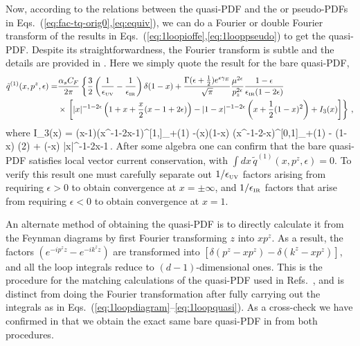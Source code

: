 \begin{widetext}
Now, according to the relations between the quasi-PDF and the \spcorr or pseudo-PDFs in Eqs.~(\ref{eq:fac-tq-orig0},\ref{eq:equiv}), we can do a Fourier or double Fourier transform of the results in Eqs.~(\ref{eq:1loopioffe},\ref{eq:1looppseudo}) to get the quasi-PDF. Despite its straightforwardness, the Fourier transform is subtle and the details are provided in . Here we simply quote the result for the bare quasi-PDF,
\begin{align}  \label{eq:1loopquasi}
\tilde{q}^{(1)}(x,p^z,\epsilon)
	=& {\alpha_sC_F\over 2\pi}\left\{{3\over2}\left({1\over \epsilon_{\mbox{\tiny UV}}}-{1\over \epsilon_{\mbox{\tiny IR}}}\right)\delta(1-x) + {\Gamma(\epsilon+{1\over2})e^{\epsilon\gamma_E}\over \sqrt{\pi}}{\mu^{2\epsilon}\over p_z^{2\epsilon}}{1-\epsilon \over \epsilon_{\mbox{\tiny IR}} (1-2\epsilon)} \right.\\
	&\times\left.\left[|x|^{-1-2\epsilon}\left(1+x+{x\over2}(x-1+2\epsilon)\right)-  |1-x|^{-1-2\epsilon}\left(x+{1\over2}(1-x)^2\right) + I_3(x)\right] \right\}\,,\nonumber
\end{align}
where
\beq
	I_3(x) = \theta(x-1)\left(x^{-1-2\epsilon}\over x-1\right)^{[1,\infty]}_{+(1)} -\theta(x)\theta(1-x) \left(x^{-1-2\epsilon}-x\right)^{[0,1]}_{+(1)} - \delta(1-x) \pi\csc(2\pi\epsilon) + \theta(-x) {|x|^{-1-2\epsilon}\over x-1}\,.
\eeq
After some algebra one can confirm that the bare quasi-PDF satisfies local vector current conservation, with $\int\! dx\, \tilde{q}^{(1)}(x,p^z,\epsilon) = 0$. To verify this result one must carefully separate out $1/\epsilon_{\mbox{\tiny UV}}$ factors arising from requiring $\epsilon>0$ to obtain convergence at $x=\pm \infty$, and $1/\epsilon_{\mbox{\tiny IR}}$ factors that arise from requiring $\epsilon<0$ to obtain convergence at $x=1$.

An alternate method of obtaining the quasi-PDF is to directly calculate it from the Feynman diagrams by first Fourier transforming $z$ into $xp^z$. As a result, the factors $(e^{-ip^z z}- e^{-ik^z z})$ are transformed into $[\delta(p^z-xp^z)-\delta(k^z-xp^z)]$, and all the loop integrals reduce to $(d-1)$-dimensional ones. This is the procedure for the matching calculations of the quasi-PDF used in Refs.~\cite{Xiong:2013bka,Stewart:2017tvs,Wang:2017qyg}, and is distinct from doing the Fourier transformation after fully carrying out the integrals as in Eqs.~(\ref{eq:1loopdiagram}--\ref{eq:1loopquasi}). As a cross-check we have confirmed in  that we obtain the exact same bare quasi-PDF in  from both procedures.


\end{widetext}
